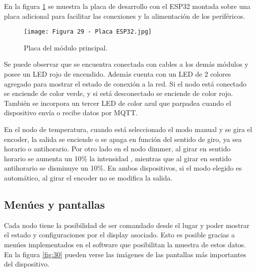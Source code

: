 En la figura \ref{fig:29} se muestra la placa de desarrollo con el ESP32 montada sobre una placa adicional para facilitar las conexiones y la alimentación de los periféricos. 

\begin{figure}[h]
\centering
\texttt{[image: Figura 29 - Placa ESP32.jpg]}
\caption[Placa del módulo principal]{Placa del módulo principal.}
\label{fig:29}
\end{figure}

Se puede observar que se encuentra conectada con cables a los demás módulos y posee un LED rojo de encendido. Además cuenta con un LED de 2 colores agregado para mostrar el estado de conexión a la red. Si el nodo está conectado se enciende de color verde, y si está desconectado se enciende de color rojo. También se incorpora un tercer LED de color azul que parpadea cuando el dispositivo envía o recibe datos por MQTT.

En el nodo de temperatura, cuando está seleccionado el modo manual y se gira el encoder, la salida se enciende o se apaga en función del sentido de giro, ya sea horario o antihorario. Por otro lado en el nodo dimmer, al girar en sentido horario se aumenta un 10\% la intensidad , mientras que al girar en sentido antihorario se disminuye un 10\%. En ambos dispositivos, si el modo elegido es automático, al girar el encoder no se modifica la salida.

\subsection{Menúes y pantallas}

Cada nodo tiene la posibilidad de ser comandado desde el lugar y poder mostrar el estado y configuraciones por el display asociado. Esto es posible gracias a menúes implementados en el software que posibilitan la muestra de estos datos. En la figura \ref{fig:30} pueden verse las imágenes de las pantallas más importantes del dispositivo.

